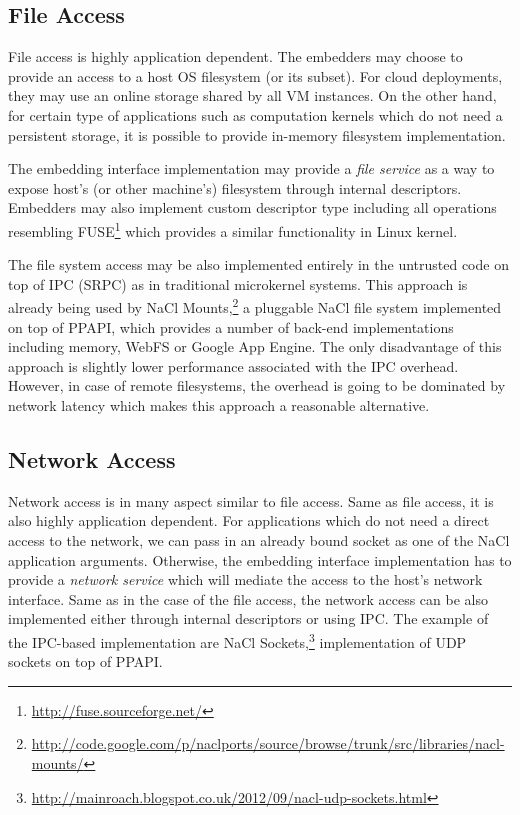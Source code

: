 
\subsection{File Access}
\label{sub:file_access}

File access is highly application dependent. The embedders may choose to
provide an access to a host OS filesystem (or its subset).  For cloud
deployments, they may use an online storage shared by all VM instances.
On the other hand, for certain type of applications such as computation
kernels which do not need a persistent storage, it is possible to
provide in-memory filesystem implementation.

The embedding interface implementation may provide a \emph{file service}
as a way to expose host's (or other machine's) filesystem through
internal descriptors. Embedders may also implement custom descriptor
type including all operations resembling
FUSE\footnote{\url{http://fuse.sourceforge.net/}} which provides a
similar functionality in Linux kernel.

The file system access may be also implemented entirely in the untrusted
code on top of IPC (\ie SRPC) as in traditional microkernel systems.
This approach is already being used by
NaCl Mounts,\footnote{\url{http://code.google.com/p/naclports/source/browse/trunk/src/libraries/nacl-mounts/}}
a pluggable NaCl file system implemented on top of PPAPI, which provides
a number of back-end implementations including memory, WebFS or Google
App Engine. The only disadvantage of this approach is slightly lower
performance associated with the IPC overhead. However, in case of remote
filesystems, the overhead is going to be dominated by network latency
which makes this approach a reasonable alternative.

\subsection{Network Access}
\label{sub:network_access}

Network access is in many aspect similar to file access. Same as file
access, it is also highly application dependent. For applications which
do not need a direct access to the network, we can pass in an already
bound socket as one of the NaCl application arguments. Otherwise, the
embedding interface implementation has to provide a \emph{network
service} which will mediate the access to the host's network interface.
Same as in the case of the file access, the network access can be also
implemented either through internal descriptors or using IPC. The
example of the IPC-based implementation are NaCl
Sockets,\footnote{\url{http://mainroach.blogspot.co.uk/2012/09/nacl-udp-sockets.html}}
implementation of UDP sockets on top of PPAPI.

